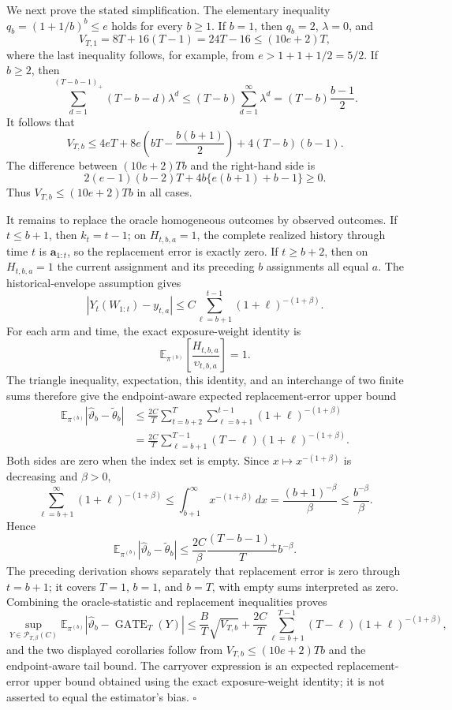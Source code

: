 We next prove the stated simplification. The elementary inequality \(q_b=(1+1/b)^b\le e\) holds for every \(b\ge1\). If \(b=1\), then \(q_b=2\), \(\lambda=0\), and
\[
V_{T,1}=8T+16(T-1)=24T-16\le(10e+2)T,
\]
where the last inequality follows, for example, from \(e>1+1+1/2=5/2\). If \(b\ge2\), then
\[
\sum_{d=1}^{(T-b-1)_+}(T-b-d)\lambda^d
\le (T-b)\sum_{d=1}^{\infty}\lambda^d
=(T-b)\frac{b-1}{2}.
\]
It follows that
\[
V_{T,b}
\le4eT+8e\left(bT-\frac{b(b+1)}2\right)+4(T-b)(b-1).
\]
The difference between \((10e+2)Tb\) and the right-hand side is
\[
2(e-1)(b-2)T+4b\{e(b+1)+b-1\}\ge0.
\]
Thus \(V_{T,b}\le(10e+2)Tb\) in all cases.

It remains to replace the oracle homogeneous outcomes by observed outcomes. If \(t\le b+1\), then \(k_t=t-1\); on \(H_{t,b,a}=1\), the complete realized history through time \(t\) is \(\mathbf a_{1:t}\), so the replacement error is exactly zero. If \(t\ge b+2\), then on \(H_{t,b,a}=1\) the current assignment and its preceding \(b\) assignments all equal \(a\). The historical-envelope assumption gives
\[
|Y_t(W_{1:t})-y_{t,a}|
\le C\sum_{\ell=b+1}^{t-1}(1+\ell)^{-(1+\beta)}.
\]
For each arm and time, the exact exposure-weight identity is
\[
\mathbb E_{\pi^{(b)}}\left[\frac{H_{t,b,a}}{\upsilon_{t,b,a}}\right]=1.
\]
The triangle inequality, expectation, this identity, and an interchange of two finite sums therefore give the endpoint-aware expected replacement-error upper bound
\[
\begin{aligned}
\mathbb E_{\pi^{(b)}}|\widehat\vartheta_b-\widetilde\theta_b|
&\le\frac{2C}{T}\sum_{t=b+2}^T\sum_{\ell=b+1}^{t-1}(1+\ell)^{-(1+\beta)}\\
&=\frac{2C}{T}\sum_{\ell=b+1}^{T-1}(T-\ell)(1+\ell)^{-(1+\beta)}.
\end{aligned}
\]
Both sides are zero when the index set is empty. Since \(x\mapsto x^{-(1+\beta)}\) is decreasing and \(\beta>0\),
\[
\sum_{\ell=b+1}^{\infty}(1+\ell)^{-(1+\beta)}
\le\int_{b+1}^{\infty}x^{-(1+\beta)}\,dx
=\frac{(b+1)^{-\beta}}{\beta}
\le\frac{b^{-\beta}}{\beta}.
\]
Hence
\[
\mathbb E_{\pi^{(b)}}|\widehat\vartheta_b-\widetilde\theta_b|
\le\frac{2C}{\beta}\frac{(T-b-1)_+}{T}b^{-\beta}.
\]
The preceding derivation shows separately that replacement error is zero through \(t=b+1\); it covers \(T=1\), \(b=1\), and \(b=T\), with empty sums interpreted as zero. Combining the oracle-statistic and replacement inequalities proves
\[
\sup_{Y\in\mathcal P_{T,\beta}(C)}
\mathbb E_{\pi^{(b)}}|\widehat\vartheta_b-\operatorname{GATE}_T(Y)|
\le\frac BT\sqrt{V_{T,b}}
+\frac{2C}{T}\sum_{\ell=b+1}^{T-1}(T-\ell)(1+\ell)^{-(1+\beta)},
\]
and the two displayed corollaries follow from \(V_{T,b}\le(10e+2)Tb\) and the endpoint-aware tail bound. The carryover expression is an expected replacement-error upper bound obtained using the exact exposure-weight identity; it is not asserted to equal the estimator's bias. \(\square\)